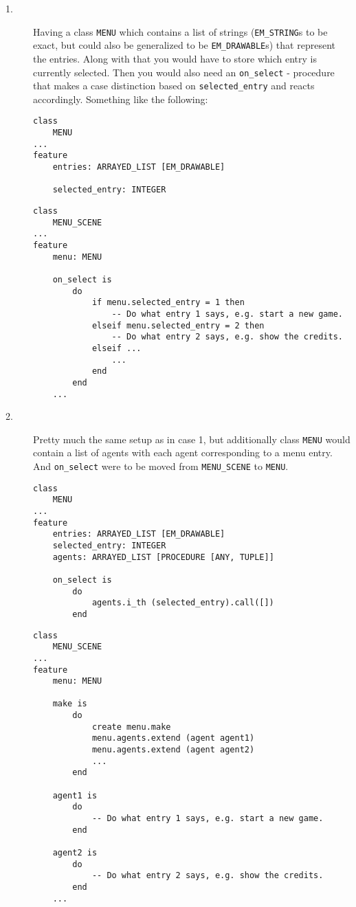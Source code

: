 \begin{description}
  \item[1.] Having a class \texttt{MENU} which contains a list of strings (\texttt{EM\_STRING}s to be exact, but could also be generalized to be \texttt{EM\_DRAWABLE}s) that represent the entries. Along with that you would have to store which entry is currently selected. Then you would also need an \texttt{on\_select} - procedure that makes a case distinction based on \texttt{selected\_entry} and reacts accordingly. Something like the following: 
    \begin{lstlisting}
class
	MENU
...
feature
	entries: ARRAYED_LIST [EM_DRAWABLE]
	
	selected_entry: INTEGER

    \end{lstlisting}
    \begin{lstlisting}
class
	MENU_SCENE
...
feature
	menu: MENU
	
	on_select is
		do
			if menu.selected_entry = 1 then
				-- Do what entry 1 says, e.g. start a new game.
	  		elseif menu.selected_entry = 2 then
				-- Do what entry 2 says, e.g. show the credits.
			elseif ...
				...
			end
		end
	...
    \end{lstlisting}
  \item[2.] Pretty much the same setup as in case 1, but additionally class \texttt{MENU} would contain a list of agents with each agent corresponding to a menu entry. And \texttt{on\_select} were to be moved from \texttt{MENU\_SCENE} to \texttt{MENU}.
    \begin{lstlisting}
class
	MENU
...
feature
	entries: ARRAYED_LIST [EM_DRAWABLE]
	selected_entry: INTEGER
	agents: ARRAYED_LIST [PROCEDURE [ANY, TUPLE]]

	on_select is
		do
			agents.i_th (selected_entry).call([])
		end

    \end{lstlisting}  
    \begin{lstlisting}
class
	MENU_SCENE
...
feature
	menu: MENU
	
	make is
		do
			create menu.make
			menu.agents.extend (agent agent1)
			menu.agents.extend (agent agent2)
			...
		end
		
	agent1 is
		do
			-- Do what entry 1 says, e.g. start a new game.
		end
		
	agent2 is
		do
			-- Do what entry 2 says, e.g. show the credits.
		end
	...
	
    \end{lstlisting}


\end{description}
